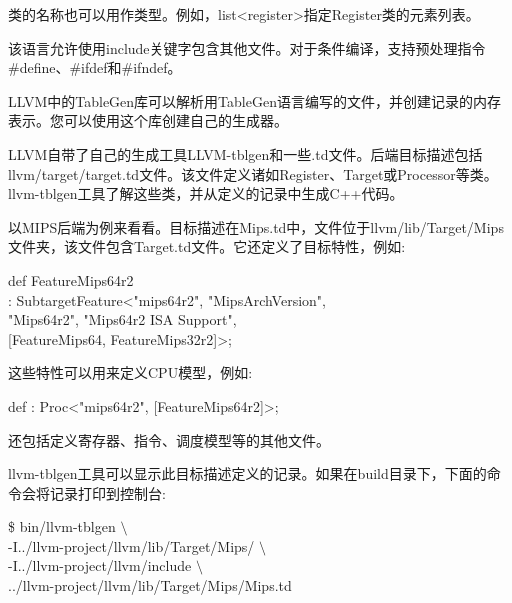 类的名称也可以用作类型。例如，list<register>指定Register类的元素列表。\par

该语言允许使用include关键字包含其他文件。对于条件编译，支持预处理指令\#define、\#ifdef和\#ifndef。\par

LLVM中的TableGen库可以解析用TableGen语言编写的文件，并创建记录的内存表示。您可以使用这个库创建自己的生成器。\par

LLVM自带了自己的生成工具LLVM-tblgen和一些.td文件。后端目标描述包括llvm/target/target.td文件。该文件定义诸如Register、Target或Processor等类。llvm-tblgen工具了解这些类，并从定义的记录中生成C++代码。\par

以MIPS后端为例来看看。目标描述在Mips.td中，文件位于llvm/lib/Target/Mips文件夹，该文件包含Target.td文件。它还定义了目标特性，例如:\par

\begin{tcolorbox}[colback=white,colframe=black]
def FeatureMips64r2 \\
\hspace*{0.5cm}: SubtargetFeature<"mips64r2", "MipsArchVersion",  \\
\hspace*{4cm}"Mips64r2", "Mips64r2 ISA Support", \\
\hspace*{4cm}[FeatureMips64, FeatureMips32r2]>;
\end{tcolorbox}

这些特性可以用来定义CPU模型，例如:\par

\begin{tcolorbox}[colback=white,colframe=black]
def : Proc<"mips64r2", [FeatureMips64r2]>;
\end{tcolorbox}

还包括定义寄存器、指令、调度模型等的其他文件。\par

llvm-tblgen工具可以显示此目标描述定义的记录。如果在build目录下，下面的命令会将记录打印到控制台:\par

\begin{tcolorbox}[colback=white,colframe=black]
\$ bin/llvm-tblgen $\setminus$ \\
\hspace*{0.5cm}-I../llvm-project/llvm/lib/Target/Mips/ $\setminus$ \\
\hspace*{0.5cm}-I../llvm-project/llvm/include $\setminus$ \\
\hspace*{0.5cm}../llvm-project/llvm/lib/Target/Mips/Mips.td
\end{tcolorbox}

